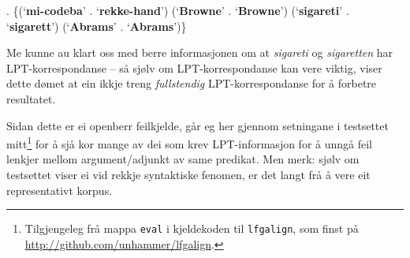 \documentclass[11pt,a4paper,oneside,draft]{book}
\newcommand{\p}[1]{`\textbf{#1}'}
\begin{document}
\ex. \{(\p{mi-codeba} . \p{rekke-hand})
 (\p{Browne} . \p{Browne}) (\p{sigareti} . \p{sigarett}) (\p{Abrams} . \p{Abrams})\}

 Me kunne au klart oss med berre informasjonen om at \emph{sigareti} og
 \emph{sigaretten} har LPT-korrespondanse -- så sjølv om LPT-korrespondanse
 kan vere viktig, viser dette dømet at ein ikkje treng \emph{fullstendig}
 LPT-korrespondanse for å forbetre resultatet.

 Sidan dette er ei openberr feilkjelde, går eg her gjennom setningane
 i testsettet mitt\footnote{Tilgjengeleg frå mappa \texttt{eval} i kjeldekoden til \texttt{lfgalign},
        som finst på \href{http://github.com/unhammer/lfgalign}{http://github.com/unhammer/lfgalign}. } for å sjå kor mange av dei som krev
 LPT-informasjon for å unngå feil lenkjer mellom argument/adjunkt av
 same predikat. Men merk: sjølv om testsettet viser ei vid rekkje
 syntaktiske fenomen, er det langt frå å vere eit representativt
 korpus.
\end{document}
